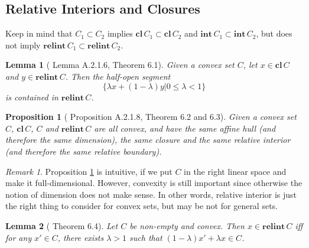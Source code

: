 \documentclass[openany]{book}
\newtheorem{lemma}{Lemma}[chapter]
\newtheorem{proposition}{Proposition}[chapter]
\theoremstyle{definition}
\theoremstyle{remark}
\newtheorem*{remark}{Remark}
\begin{document}
\subsection{Relative Interiors and Closures}
Keep in mind that $C_1\subset C_2$ implies $\mathbf{cl}\,C_1\subset \mathbf{cl}\,C_2$ and $\mathbf{int}\,C_1\subset \mathbf{int}\,C_2$, but does not imply $\mathbf{relint}\,C_1\subset \mathbf{relint}\,C_2$.
\begin{lemma}[\cite{HL12} Lemma A.2.1.6, \cite{R15} Theorem 6.1]
    Given a convex set $C$, let $x\in \mathbf{cl}\,C$ and $y\in \mathbf{relint}\,C$. Then the half-open segment
    \begin{equation*}
        \{\lambda x+(1-\lambda)y|0\le\lambda<1\}
    \end{equation*}
    is contained in $\mathbf{relint}\,C$.
\end{lemma}
\begin{proposition}[\cite{HL12} Proposition A.2.1.8, \cite{R15} Theorem 6.2 and 6.3]\label{prop:clRelInt}
    Given a convex set $C$, $\mathbf{cl}\,C$, $C$ and $\mathbf{relint}\,C$ are all convex, and have the same affine hull (and therefore the same dimension), the same closure and the same relative interior (and therefore the same relative boundary).
\end{proposition}
\begin{remark}
    Proposition \ref{prop:clRelInt} is intuitive, if we put $C$ in the right linear space and make it full-dimensional. However, convexity is still important since otherwise the notion of dimension does not make sense. In other words, relative interior is just the right thing to consider for convex sets, but may be not for general sets.
\end{remark}
\begin{lemma}[\cite{R15} Theorem 6.4]
    Let $C$ be non-empty and convex. Then $x\in \mathbf{relint}\,C$ iff for any $x'\in C$, there exists $\lambda>1$ such that $(1-\lambda)x'+\lambda x\in C$.
\end{lemma}
\end{document}
